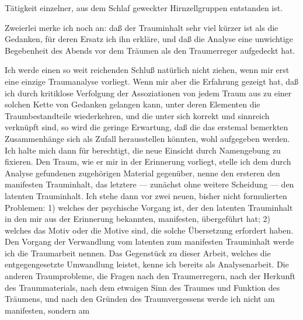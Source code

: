 \documentclass[twoside=true,titlepage=false,open=any, parskip=never, fontsize=10pt, headings=small, chapterprefix=false, appendixprefix=false]{scrbook}
\begin{document}
         
            
            
            
        \pstart
        Tätigkeit einzelner, aus dem Schlaf geweckter Hirnzellgruppen
               entstanden ist.
        \pend
    
            
        \pstart
        Zweierlei merke ich noch an: daß der Trauminhalt sehr viel kürzer ist als die
               Gedanken, für deren Ersatz ich ihn erkläre, und daß die Analyse eine unwichtige
               Begebenheit des Abends vor dem Träumen als den Traumerreger aufgedeckt hat.
        \pend
    
            
        \pstart
        Ich werde einen so weit reichenden Schluß natürlich nicht ziehen, wenn mir erst
               eine einzige Traumanalyse vorliegt. Wenn mir aber die Erfahrung gezeigt hat, daß
               ich durch kritiklose Verfolgung der Assoziationen von jedem Traum aus zu einer solchen Kette von
               Gedanken gelangen kann, unter deren Elementen die Traumbestandteile
               wiederkehren, und die unter sich korrekt und sinnreich verknüpft sind, so wird
               die geringe Erwartung, daß die das erstemal bemerkten Zusammenhänge sich als
               Zufall herausstellen könnten, wohl aufgegeben werden. Ich halte mich
               dann für berechtigt, die neue Einsicht durch Namengebung zu fixieren. Den
               Traum, wie er mir in der Erinnerung vorliegt, stelle ich dem durch Analyse
               gefundenen zugehörigen Material gegenüber, nenne den ersteren den manifesten Trauminhalt, das letztere — zunächst
               ohne weitere Scheidung — den latenten Trauminhalt.
               Ich stehe dann vor zwei neuen, bisher nicht formulierten Problemen: 1) welches der psychische Vorgang ist, der den latenten
               Trauminhalt in den mir aus der Erinnerung bekannten, manifesten, übergeführt
               hat; 2) welches das Motiv oder die Motive sind, die
               solche Übersetzung erfordert haben. Den Vorgang der Verwandlung vom latenten zum
               manifesten Trauminhalt werde ich die Traumarbeit
               nennen. Das Gegenstück zu dieser Arbeit, welches die entgegengesetzte
               Umwandlung leistet, kenne ich bereits als Analysenarbeit. Die anderen Traumprobleme, die Fragen nach den
               Traumerregern, nach der Herkunft des Traummaterials, nach dem etwaigen Sinn
               des Traumes und Funktion des Träumens, und nach den Gründen des
               Traumvergessens werde ich nicht am manifesten, sondern am
        \pend
    
\end{document}
